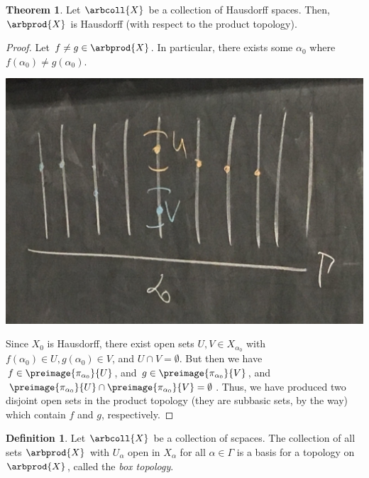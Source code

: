 \documentclass[a5paper]{article}
\theoremstyle{definition}%
\newtheorem{theorem}{Theorem}
\newtheorem*{definition*}{Definition}
\numberwithin{exercise}{section}
\theoremstyle{remark}%
\begin{document}
\begin{highlight}
\begin{theorem}
Let $\arbcoll{X}$ be a collection of Hausdorff spaces. Then, $\arbprod{X}$ is Hausdorff (with respect to the product topology). 
\end{theorem}
\end{highlight}
\begin{proof}
Let $f\neq g\in \arbprod{X}$. In particular, there exists some $\alpha_0$ where $f(\alpha_0)\neq g(\alpha_0)$. 

\begin{center}
\includegraphics[scale=.12]{images/general_products2}
\end{center}

Since $X_0$ is Hausdorff, there exist open sets $U,V \in X_{\alpha_0}$ with $f(\alpha_0)\in U, g(\alpha_0)\in V$, and $U\cap V=\emptyset$. But then we have $f\in \preimage{\pi_{\alpha_0}}{U}$, and $g\in \preimage{\pi_{\alpha_0}}{V}$, and $\preimage{\pi_{\alpha_0}}{U} \cap \preimage{\pi_{\alpha_0}}{V} = \emptyset$. Thus, we have produced two disjoint open sets in the product topology (they are subbasic sets, by the way) which contain $f$ and $g$, respectively. 
\end{proof}

\begin{highlight}
\begin{definition*}
Let $\arbcoll{X}$ be a collection of scpaces. The collection of all sets $\arbprod{X}$ with $U_\alpha$ open in $X_\alpha$ for all $\alpha\in\Gamma$ is a basis for a topology on $\arbprod{X}$, called the \emph{box topology}. 
\end{definition*}
\end{highlight}
\end{document}
